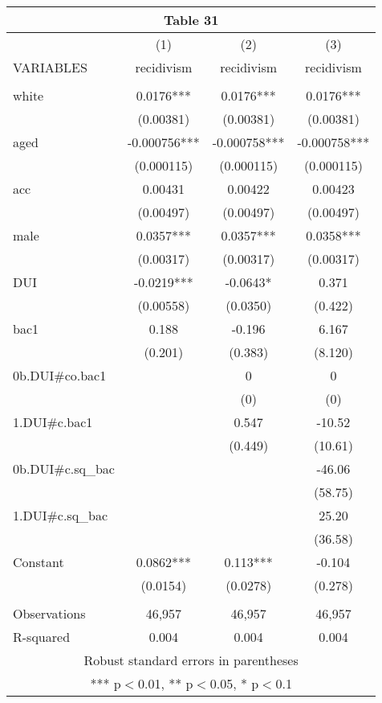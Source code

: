 \documentclass[]{article}
\begin{document}
\begin{tabular}{lccc}
\multicolumn{4}{c}{Table 31} \\ \hline
 & (1) & (2) & (3) \\
VARIABLES & recidivism & recidivism & recidivism \\ \hline
 &  &  &  \\
white & 0.0176*** & 0.0176*** & 0.0176*** \\
 & (0.00381) & (0.00381) & (0.00381) \\
aged & -0.000756*** & -0.000758*** & -0.000758*** \\
 & (0.000115) & (0.000115) & (0.000115) \\
acc & 0.00431 & 0.00422 & 0.00423 \\
 & (0.00497) & (0.00497) & (0.00497) \\
male & 0.0357*** & 0.0357*** & 0.0358*** \\
 & (0.00317) & (0.00317) & (0.00317) \\
DUI & -0.0219*** & -0.0643* & 0.371 \\
 & (0.00558) & (0.0350) & (0.422) \\
bac1 & 0.188 & -0.196 & 6.167 \\
 & (0.201) & (0.383) & (8.120) \\
0b.DUI\#co.bac1 &  & 0 & 0 \\
 &  & (0) & (0) \\
1.DUI\#c.bac1 &  & 0.547 & -10.52 \\
 &  & (0.449) & (10.61) \\
0b.DUI\#c.sq\_bac &  &  & -46.06 \\
 &  &  & (58.75) \\
1.DUI\#c.sq\_bac &  &  & 25.20 \\
 &  &  & (36.58) \\
Constant & 0.0862*** & 0.113*** & -0.104 \\
 & (0.0154) & (0.0278) & (0.278) \\
 &  &  &  \\
Observations & 46,957 & 46,957 & 46,957 \\
 R-squared & 0.004 & 0.004 & 0.004 \\ \hline
\multicolumn{4}{c}{ Robust standard errors in parentheses} \\
\multicolumn{4}{c}{ *** p$<$0.01, ** p$<$0.05, * p$<$0.1} \\
\end{tabular}
\end{document}
